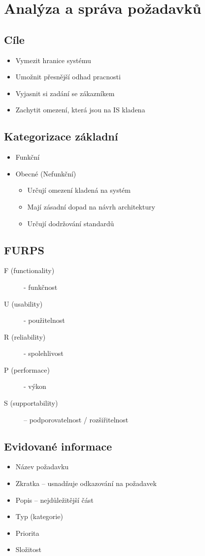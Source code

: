 \documentclass{szzclass}
\begin{document}
\section{Analýza a správa požadavků}
\subsection{Cíle}
\begin{itemize}
\item Vymezit hranice systému
\item Umožnit přesnější odhad pracnosti
\item Vyjasnit si zadání se zákazníkem
\item Zachytit omezení, která jsou na IS kladena
\end{itemize}

\subsection{Kategorizace základní}
\begin{itemize}
\item Funkční
\item Obecné (Nefunkční)
  \begin{itemize}
  \item Určují omezení kladená na systém
  \item Mají zásadní dopad na návrh architektury
  \item Určují dodržování standardů
  \end{itemize}
\end{itemize}

\subsection{FURPS}
\begin{description}
\item[F (functionality)] - funkčnost
\item[U (usability)] - použitelnost
\item[R (reliability)] - spolehlivost
\item[P (performace)] - výkon
\item[S (supportability)] – podporovatelnost / rozšiřitelnost
\end{description}

\subsection{Evidované informace}
\begin{itemize}
\item Název požadavku
\item Zkratka – usnadňuje odkazování na požadavek
\item Popis – nejdůležitější část
\item Typ (kategorie)
\item Priorita
\item Složitost
\end{itemize}
\end{document}

